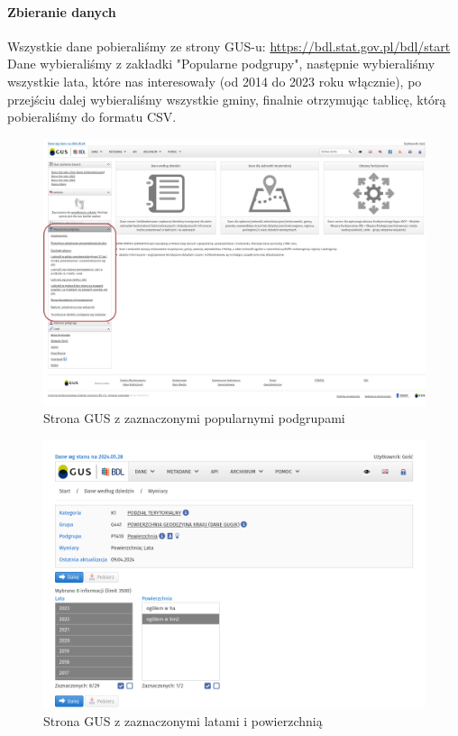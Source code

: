 \documentclass[12pt]{article}
\begin{document}
\paragraph{Zbieranie danych}
Wszystkie dane pobieraliśmy ze strony GUS-u:
\href{https://bdl.stat.gov.pl/bdl/start}{https://bdl.stat.gov.pl/bdl/start} 
Dane wybieraliśmy z zakładki "Popularne podgrupy", następnie wybieraliśmy wszystkie lata, które nas interesowały (od 2014 do 2023 roku włącznie), po przejściu dalej wybieraliśmy wszystkie gminy, finalnie otrzymując tablicę, którą pobieraliśmy do formatu CSV.
\begin{figure}[H]
    \caption{Strona GUS z zaznaczonymi popularnymi podgrupami}
    \centering
    \includegraphics[width=1.0\textwidth]{gus}
\end{figure}
\begin{figure}[H]
    \caption{Strona GUS z zaznaczonymi latami i powierzchnią}
    \centering
    \includegraphics[width=1.0\textwidth]{dane3}
\end{figure}
\end{document}
